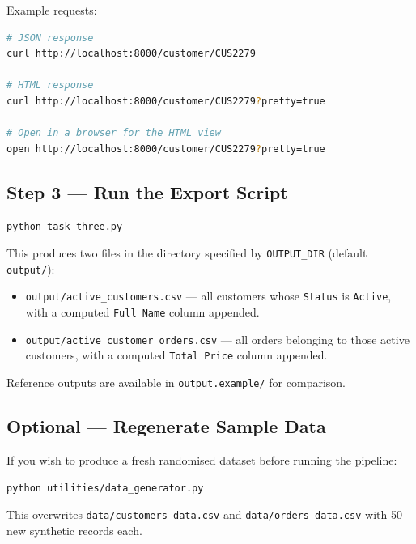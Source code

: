 \documentclass[12pt,a4paper]{article}
\begin{document}
Example requests:

\begin{lstlisting}[language=bash, caption={Example API calls}]
# JSON response
curl http://localhost:8000/customer/CUS2279

# HTML response
curl http://localhost:8000/customer/CUS2279?pretty=true

# Open in a browser for the HTML view
open http://localhost:8000/customer/CUS2279?pretty=true
\end{lstlisting}

\subsection{Step 3 --- Run the Export Script}

\begin{lstlisting}[language=bash, caption={Generate CSV exports}]
python task_three.py
\end{lstlisting}

This produces two files in the directory specified by \texttt{OUTPUT\_DIR}
(default \texttt{output/}):

\begin{itemize}[leftmargin=2em]
    \item \texttt{output/active\_customers.csv} --- all customers whose
          \texttt{Status} is \texttt{Active}, with a computed \texttt{Full Name}
          column appended.
    \item \texttt{output/active\_customer\_orders.csv} --- all orders belonging
          to those active customers, with a computed \texttt{Total Price} column
          appended.
\end{itemize}

Reference outputs are available in \texttt{output.example/} for comparison.

\subsection{Optional --- Regenerate Sample Data}

If you wish to produce a fresh randomised dataset before running the pipeline:

\begin{lstlisting}[language=bash, caption={Regenerate sample CSV data}]
python utilities/data_generator.py
\end{lstlisting}

This overwrites \texttt{data/customers\_data.csv} and
\texttt{data/orders\_data.csv} with 50 new synthetic records each.
\end{document}
